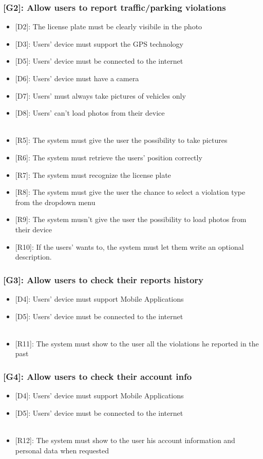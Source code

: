 \documentclass[12pt,a4paper]{article}
\begin{document}
\subsubsection*{{[}{G2}{]}: Allow users to report traffic/parking violations}
\begin{itemize}
\item {[D2]}: The license plate must be clearly visibile in the photo
\item {[D3]}: Users' device must support the GPS technology
\item {[D5]}: Users' device must be connected to the internet
\item {[D6]}: Users' device must have a camera
\item {[D7]}: Users' must always take pictures of vehicles only
\item {[D8]}: Users' can't load photos from their device 
\\\\
\item {[R5]}: The system must give the user the possibility to take pictures
\item {[R6]}: The system must retrieve the users' position correctly
\item {[R7]}: The system must recognize the license plate 
\item {[R8]}: The system must give the user the chance to select a violation type from the dropdown menu
\item {[R9]}: The system musn't give the user the possibility to load photos from their device
\item {[R10]}: If the users' wants to, the system must let them write an optional description.
\end{itemize}
\subsubsection*{{[}{G3}{]}: Allow users to check their reports history}
\begin{itemize}
\item {[D4]}: Users' device must support Mobile Applications
\item {[D5]}: Users' device must be connected to the internet
\\\\ 
\item {[R11]}: The system must show to the user all the violations he reported in the past
\end{itemize}
\subsubsection*{{[}{G4}{]}: Allow users to check their account info}
\begin{itemize}
\item {[D4]}: Users' device must support Mobile Applications
\item {[D5]}: Users' device must be connected to the internet
\\\\
\item {[R12]}: The system must show to the user his account information and personal data when requested
\end{itemize}
\end{document}
